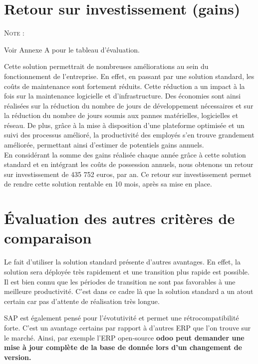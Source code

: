 \section{Retour sur investissement (gains)}

\begin{shaded}
\noindent\textsc{Note :} 

Voir Annexe A pour le tableau d'évaluation.
\end{shaded}

Cette solution permettrait de nombreuses améliorations au sein du fonctionnement de l’entreprise. En effet, en passant par une solution standard, les coûts de maintenance sont fortement réduits. Cette réduction a un impact à la fois sur la maintenance logicielle et d’infrastructure. Des économies sont ainsi réalisées sur la réduction du nombre de jours de développement nécessaires et sur la réduction du nombre de jours soumis aux pannes matérielles, logicielles et réseau. De plus, grâce à la mise à disposition d’une plateforme optimisée et un suivi des processus amélioré, la productivité des employés s’en trouve grandement améliorée, permettant ainsi d’estimer de potentiels gains annuels. \\

En considérant la somme des gains réalisée chaque année grâce à cette solution standard et en intégrant les coûts de possession annuels, nous obtenons un retour sur investissement de 435 752 euros, par an. Ce retour sur investissement permet de rendre cette solution rentable en 10 mois, après sa mise en place.

\section{Évaluation des autres critères de comparaison}

Le fait d’utiliser la solution standard présente d’autres avantages. En effet, la solution sera déployée très rapidement et une transition plus rapide est possible. Il est bien connu que les périodes de transition ne sont pas favorables à une meilleure productivité. C’est dans ce cadre là que la solution standard a un atout certain car pas d’attente de réalisation très longue.

SAP est également pensé pour l’évotutivité et permet une rétrocompatibilité forte. C’est un avantage certains par rapport à d’autres ERP que l’on trouve sur le marché. Ainsi, par exemple l’ERP open-source \bf{odoo} peut demander une mise à jour complète de la base de donnée lors d’un changement de version.

